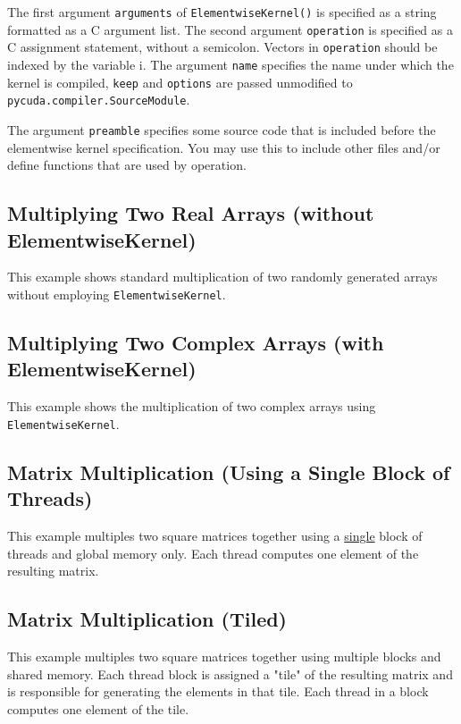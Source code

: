 \documentclass[article,A4,12pt]{llncs}
\begin{document}
The first argument {\tt arguments} of {\tt ElementwiseKernel()} is specified as a string formatted as 
a C argument list. The second argument {\tt operation} is specified as a C assignment statement, 
without a semicolon. Vectors in {\tt operation} should be indexed by the variable i. The argument 
{\tt name} specifies the name under which the kernel is compiled, {\tt keep} and {\tt options} 
are passed unmodified to {\tt pycuda.compiler.SourceModule}.

The argument {\tt preamble} specifies some source code that is included before the elementwise 
kernel specification. You may use this to include other files and/or define functions that 
are used by operation.

\subsection{Multiplying Two Real Arrays (without ElementwiseKernel)}

This example shows standard multiplication of two randomly generated 
arrays without employing {\tt ElementwiseKernel}. 

\subsection{Multiplying Two Complex Arrays (with ElementwiseKernel)}

This example shows the multiplication of two complex arrays using 
{\tt ElementwiseKernel}.  

\subsection{Matrix Multiplication (Using a Single Block of Threads)}

This example multiples two square matrices together using a \underline{single} block 
of threads and global memory only. Each thread computes one element of 
the resulting matrix.

\subsection{Matrix Multiplication (Tiled)}

This example multiples two square matrices together using multiple blocks and shared memory. Each thread block is assigned a "tile" of the resulting matrix and is responsible for generating the elements in that tile. Each thread in a block computes one element of the tile. 
\end{document}
